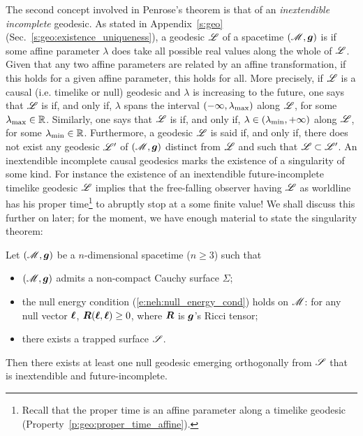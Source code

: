 The second concept involved in Penrose's theorem is that of
an \emph{inextendible incomplete} geodesic. As stated in
Appendix~\ref{s:geo} (Sec.~\ref{s:geo:existence_uniqueness}), a
geodesic $\mathscr{L}$ of a spacetime $(\mathscr{M},\bm{g})$ is  if some affine parameter $\lambda$ does take all
possible real values along the whole of $\mathscr{L}$.
Given that any two affine parameters are related by
an affine transformation, if this holds for a given affine parameter, this holds for all.
More precisely, if $\mathscr{L}$ is a causal (i.e. timelike or null) geodesic and $\lambda$ is increasing to the future, one says that $\mathscr{L}$
is  if, and only if, $\lambda$ spans the interval
$(-\infty,\lambda_{\rm max})$ along $\mathscr{L}$, for some $\lambda_{\rm max}\in\mathbb{R}$.
Similarly, one says that $\mathscr{L}$
is  if, and only if,
$\lambda\in(\lambda_{\rm min},+\infty)$ along $\mathscr{L}$, for some $\lambda_{\rm min}\in\mathbb{R}$.
Furthermore, a geodesic $\mathscr{L}$ is said  if, and only if,
there does not exist any geodesic $\mathscr{L}'$ of $(\mathscr{M},\bm{g})$ distinct from $\mathscr{L}$
and such that $\mathscr{L}\subset\mathscr{L}'$. An inextendible incomplete causal geodesics
marks the existence of a singularity of some kind. For instance the existence of an
inextendible future-incomplete timelike geodesic $\mathscr{L}$ implies that the free-falling
observer having $\mathscr{L}$ as worldline has his proper time\footnote{Recall that
the proper time is an affine parameter along a timelike geodesic (Property~\ref{p:geo:proper_time_affine}).} to abruptly
stop at a some finite value!
We shall discuss this further on later; for the moment, we have enough material
to state the singularity theorem:

\begin{prop}
Let $(\mathscr{M},\bm{g})$ be a $n$-dimensional spacetime ($n\ge 3$) such that
\begin{itemize}
\item $(\mathscr{M},\bm{g})$ admits a non-compact Cauchy surface $\Sigma$;
\item the null energy condition (\ref{e:neh:null_energy_cond}) holds on $\mathscr{M}$:
for any null vector $\bm{\ell}$, $\bm{R}(\bm{\ell}, \bm{\ell}) \geq 0$, where $\bm{R}$ is
$\bm{g}$'s Ricci tensor;
\item there exists a trapped surface $\mathscr{S}$.
\end{itemize}
Then there exists at least one null geodesic emerging orthogonally from $\mathscr{S}$
that is inextendible and future-incomplete.
\end{prop}

